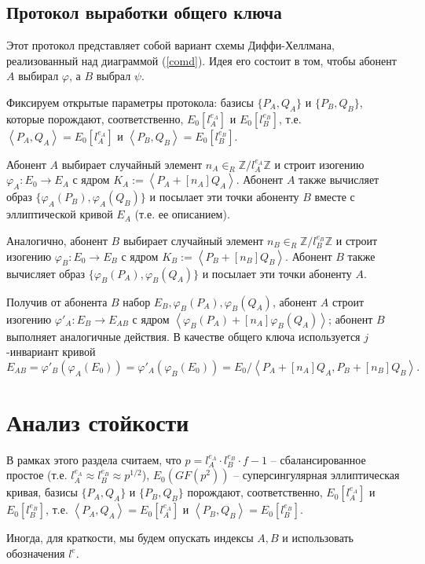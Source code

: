 \documentclass[a4paper,12pt]{article}
\newcommand{\ZZ}{\mathbb{Z}}
\newcommand{\tr}[1]{\left\langle #1\right\rangle}
\theoremstyle{definition}
\begin{document}
\subsection*{Протокол выработки общего ключа}

Этот протокол представляет собой вариант схемы Диффи-Хеллмана, реализованный над диаграммой (\ref{comd}). Идея его состоит в том, чтобы абонент $A$ выбирал $\varphi$, а $B$ выбрал $\psi$.

Фиксируем открытые параметры протокола:
базисы $\{P_A,Q_A\}$ и $\{P_B,Q_B\}$, которые порождают, соответственно, $E_0[l_A^{e_A}]$ и $E_0[l_B^{e_B}]$, т.е. $\tr{P_A,Q_A}=E_0[l_A^{e_A}]$ и $\tr{P_B,Q_B}=E_0[l_B^{e_B}]$.

 Абонент $A$ выбирает  случайный элемент $ n_A\in_R\ZZ/l_A^{e_A}\ZZ$ %
 и строит изогению $\varphi_A:E_0\to E_A$ с ядром $K_A:=\tr{ P_A+[n_A]Q_A}$.  Абонент $A$  также вычисляет образ $\{\varphi_A(P_B),\varphi_A(Q_B)\}$ и посылает эти точки абоненту $B$ вместе с эллиптической кривой $E_A$ (т.е. ее описанием).
 
 Аналогично, абонент $B$ выбирает   случайный элемент  $ n_B\in_R\ZZ/l_B^{e_B}\ZZ$ %
 и строит изогению $\varphi_B:E_0\to E_B$ с ядром $K_B:=\tr{ P_B+[n_B]Q_B}$.  Абонент $B$  также вычисляет образ $\{\varphi_B(P_A),\varphi_B(Q_A)\}$ и посылает эти точки абоненту $A$.
 
 Получив от абонента $B$ набор $E_B, \varphi_B(P_A),\varphi_B(Q_A)$, абонент $A$ строит изогению $\varphi'_A:E_B\to E_{AB}$ с ядром $\tr{ \varphi_B(P_A)+[n_A]\varphi_B(Q_A)}$; абонент $B$ выполняет аналогичные действия.
 В качестве общего ключа  используется $j$-инвариант кривой
 $$
 E_{AB}=\varphi'_B(\varphi_A(E_0))=\varphi'_A(\varphi_B(E_0))=E_0/\tr{ P_A+[n_A]Q_A,  P_B+[n_B]Q_B }.
 $$

\section{Анализ стойкости}\label{analysis}

В рамках этого раздела считаем, что $p=l_A^{e_A}\cdot l_B^{e_B}\cdot f-1$ -- сбалансированное простое (т.е. $l_A^{e_A}\approx l_B^{e_B}\approx p^{1/2}$), $E_0(GF(p^2))$ -- суперсингулярная эллиптическая кривая, базисы $\{P_A,Q_A\}$ и $\{P_B,Q_B\}$
порождают, соответственно, $E_0[l_A^{e_A}]$ и $E_0[l_B^{e_B}]$, т.е. $\tr{P_A,Q_A}=E_0[l_A^{e_A}]$ и $\tr{P_B,Q_B}=E_0[l_B^{e_B}]$. 

Иногда, для краткости, мы будем опускать индексы $A, B$ и использовать обозначения $l^e$.
\end{document}
